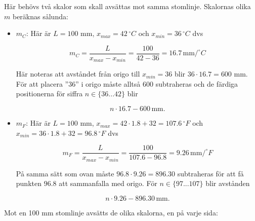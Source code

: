 \documentclass[oneside,11pt,a4paper,swedish]{scrbook}
\begin{document}
Här behövs två skalor som skall avsättas mot samma stomlinje. Skalornas olika $m$ beräknas sålunda:

\begin{itemize}

\item $m_{C}$: Här är $L = 100$ mm, $x_{max}=42\,^\circ C$  och $x_{min}=36\,^\circ C$ dvs 

\[m_C = \frac{L}{x_{max}-x_{min}}= \frac{100}{42-36} = 16.7\, \textrm{mm}/^\circ C \]

Här noteras att avståndet från origo till $x_{min}=36$ blir $36\cdot 16.7 = 600$ mm. För att placera ''36'' i origo måste alltså 600 subtraheras och de färdiga positionerna för siffra $ n \in \{36...42\}$ blir 

\[ n \cdot 16.7 -600\,\textrm{mm}.\]

\item $m_{F}$: Här är $L = 100$ mm, $x_{max}=42\cdot 1.8 + 32=107.6\,^\circ F$  och $x_{min}=36\cdot 1.8 + 32=96.8\,^\circ F$ dvs 

\[m_F = \frac{L}{x_{max}-x_{min}}= \frac{100}{107.6-96.8} = 9.26\, \textrm{mm}/^\circ F \]

På samma sätt som ovan måste $96.8\cdot 9.26 = 896.30$ subtraheras för att få punkten $96.8$ att sammanfalla med origo. För 
$n \in \{97...107\}$ blir avstånden 

\[ n \cdot 9.26 -896.30\,\textrm{mm}.\]

\end{itemize}

Mot en 100 mm stomlinje avsätts de olika skalorna, en på varje sida:


\end{document}
